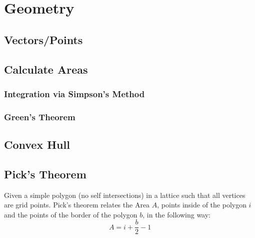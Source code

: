 \documentclass[../Notes/main.tex]{subfiles}
\begin{document}
\section{Geometry}
\subsection{Vectors/Points}


\subsection{Calculate Areas}
\subsubsection{Integration via Simpson's Method}


\subsubsection{Green's Theorem}


\subsection{Convex Hull}


\subsection{Pick's Theorem}
Given a simple polygon (no self intersections) in a lattice such that all vertices are grid points. Pick's theorem relates the Area \(A\), points inside of the polygon \(i\) and the points of the border of the polygon \(b\), in the following way:
\begin{equation*}
    A=i+\frac{b}2-1
\end{equation*}
\end{document}
